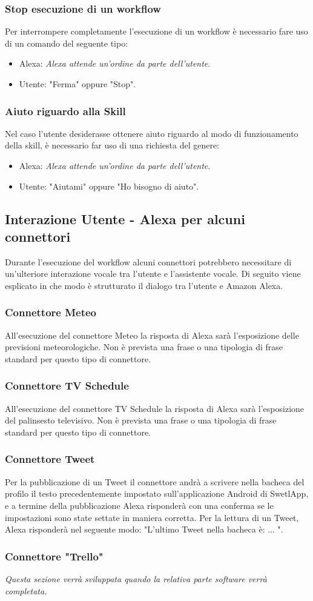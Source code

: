\subsubsection{Stop esecuzione di un workflow}
Per interrompere completamente l'esecuzione di un workflow è necessario fare uso di un comando del seguente tipo:
\begin{itemize}
	\item Alexa: \textit{Alexa attende un'ordine da parte dell'utente}.
	\item Utente: "Ferma" oppure "Stop".
\end{itemize}
\subsubsection{Aiuto riguardo alla Skill}
Nel caso l'utente desiderasse ottenere aiuto riguardo al modo di funzionamento della skill, è necessario far uso di una richiesta del genere:
\begin{itemize}
	\item Alexa: \textit{Alexa attende un'ordine da parte dell'utente}.
	\item Utente: "Aiutami" oppure "Ho bisogno di aiuto".
\end{itemize}

\subsection{Interazione Utente - Alexa per alcuni connettori}
Durante l’esecuzione del workflow alcuni connettori potrebbero necessitare di un’ulteriore
interazione vocale tra l’utente e l’assistente vocale. Di seguito viene esplicato in che modo
è strutturato il dialogo tra l’utente e Amazon Alexa.
\subsubsection{Connettore Meteo}
All'esecuzione del connettore Meteo la risposta di Alexa sarà l'esposizione delle previsioni meteorologiche. Non è prevista una frase o una tipologia di frase standard per questo tipo di connettore.
\subsubsection{Connettore TV Schedule}
All'esecuzione del connettore TV Schedule la risposta di Alexa sarà l'esposizione del palinsesto televisivo. Non è prevista una frase o una tipologia di frase standard per questo tipo di connettore.
\subsubsection{Connettore Tweet}
Per la pubblicazione di un Tweet il connettore andrà a scrivere nella bacheca del profilo il testo precedentemente impostato sull'applicazione Android di SwetlApp, e a termine della pubblicazione Alexa risponderà con una conferma se le impostazioni sono state settate in maniera corretta.
Per la lettura di un Tweet, Alexa risponderà nel seguente modo: "L'ultimo Tweet nella bacheca è: ... ".
\subsubsection{Connettore "Trello"}
\textit{Questa sezione verrà sviluppata quando la relativa parte software verrà completata.}